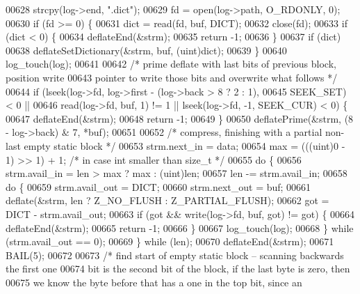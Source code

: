 \begin{DoxyCode}
00628         strcpy(log->end, \textcolor{stringliteral}{".dict"});
00629         fd = open(log->path, O\_RDONLY, 0);
00630         \textcolor{keywordflow}{if} (fd >= 0) \{
00631             dict = read(fd, buf, DICT);
00632             close(fd);
00633             \textcolor{keywordflow}{if} (dict < 0) \{
00634                 deflateEnd(&strm);
00635                 \textcolor{keywordflow}{return} -1;
00636             \}
00637             \textcolor{keywordflow}{if} (dict)
00638                 deflateSetDictionary(&strm, buf, (uint)dict);
00639         \}
00640         log\_touch(log);
00641 
00642         \textcolor{comment}{/* prime deflate with last bits of previous block, position write}
00643 \textcolor{comment}{           pointer to write those bits and overwrite what follows */}
00644         \textcolor{keywordflow}{if} (lseek(log->fd, log->first - (log->back > 8 ? 2 : 1),
00645                 SEEK\_SET) < 0 ||
00646             read(log->fd, buf, 1) != 1 || lseek(log->fd, -1, SEEK\_CUR) < 0) \{
00647             deflateEnd(&strm);
00648             \textcolor{keywordflow}{return} -1;
00649         \}
00650         deflatePrime(&strm, (8 - log->back) & 7, *buf);
00651 
00652         \textcolor{comment}{/* compress, finishing with a partial non-last empty static block */}
00653         strm.next\_in = data;
00654         max = (((uint)0 - 1) >> 1) + 1; \textcolor{comment}{/* in case int smaller than size\_t */}
00655         \textcolor{keywordflow}{do} \{
00656             strm.avail\_in = len > max ? max : (uint)len;
00657             len -= strm.avail\_in;
00658             \textcolor{keywordflow}{do} \{
00659                 strm.avail\_out = DICT;
00660                 strm.next\_out = buf;
00661                 deflate(&strm, len ? Z\_NO\_FLUSH : Z\_PARTIAL\_FLUSH);
00662                 got = DICT - strm.avail\_out;
00663                 \textcolor{keywordflow}{if} (got && write(log->fd, buf, got) != got) \{
00664                     deflateEnd(&strm);
00665                     \textcolor{keywordflow}{return} -1;
00666                 \}
00667                 log\_touch(log);
00668             \} \textcolor{keywordflow}{while} (strm.avail\_out == 0);
00669         \} \textcolor{keywordflow}{while} (len);
00670         deflateEnd(&strm);
00671         BAIL(5);
00672 
00673         \textcolor{comment}{/* find start of empty static block -- scanning backwards the first one}
00674 \textcolor{comment}{           bit is the second bit of the block, if the last byte is zero, then}
00675 \textcolor{comment}{           we know the byte before that has a one in the top bit, since an}

\end{DoxyCode}
